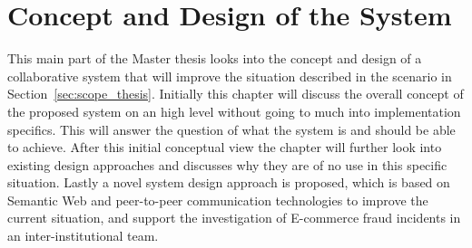
\chapter{Concept and Design of the System} %
\label{cha:design_system}

This main part of the Master thesis looks into the concept and design of a collaborative system that will improve the situation described in the scenario in Section~\ref{sec:scope_thesis}. Initially this chapter will discuss the overall concept of the proposed system on an high level without going to much into implementation specifics. This will answer the question of what the system is and should be able to achieve. After this initial conceptual view the chapter will further look into existing design approaches and discusses why they are of no use in this specific situation. Lastly a novel system design approach is proposed, which is based on Semantic Web and peer-to-peer communication technologies to improve the current situation, and support the investigation of E-commerce fraud incidents in an inter-institutional team.







